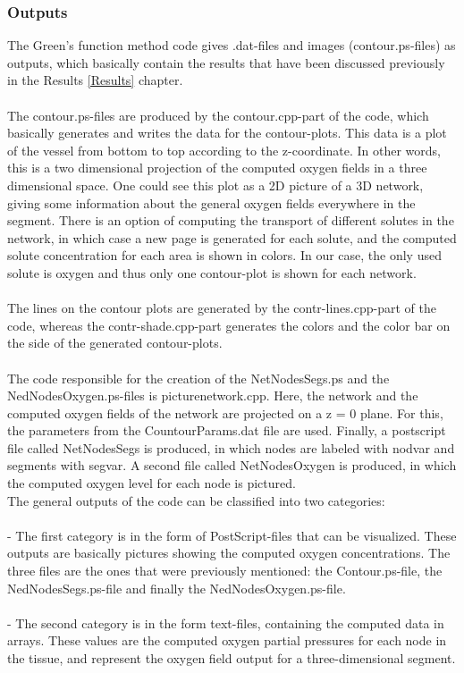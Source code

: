 \subsubsection*{Outputs}
\label{Outputs}

The Green's function method code gives .dat-files and images (contour.ps-files) as outputs, which basically contain the results that have been discussed previously in the Results \ref{Results} chapter.
\\
\\The contour.ps-files are produced by the contour.cpp-part of the code, which basically generates and writes the data for the contour-plots. This data is a plot of the vessel from bottom to top according to the z-coordinate. In other words, this is a two dimensional projection of the computed oxygen fields in a three dimensional space. One could see this plot as a 2D picture of a 3D network, giving some information about the general oxygen fields everywhere in the segment. There is an option of computing the transport of different solutes in the network, in which case a new page is generated for each solute, and the computed solute concentration for each area is shown in colors. In our case, the only used solute is oxygen and thus only one contour-plot is shown for each network.
\\
\\The lines on the contour plots are generated by the contr-lines.cpp-part of the code, whereas the contr-shade.cpp-part generates the colors and the color bar on the side of the generated contour-plots.
\\
\\The code responsible for the creation of the NetNodesSegs.ps and the NedNodesOxygen.ps-files is picturenetwork.cpp. Here, the network and the computed oxygen fields of the network are projected on a z = 0 plane. For this, the parameters from the CountourParams.dat file are used. Finally, a postscript file called NetNodesSegs is produced, in which nodes are labeled with nodvar and segments with segvar. A second file called NetNodesOxygen is produced, in which the computed oxygen level for each node is pictured.
\\
\newpage
The general outputs of the code can be classified into two categories:\\
\\- The first category is in the form of PostScript-files that can be visualized. These outputs are basically pictures showing the computed oxygen concentrations. The three files are the ones that were previously mentioned: the Contour.ps-file, the NedNodesSegs.ps-file and finally the NedNodesOxygen.ps-file.\\
\\- The second category is in the form text-files, containing the computed data in arrays. These values are the computed oxygen partial pressures for each node in the tissue, and represent the oxygen field output for a three-dimensional segment.
\\

